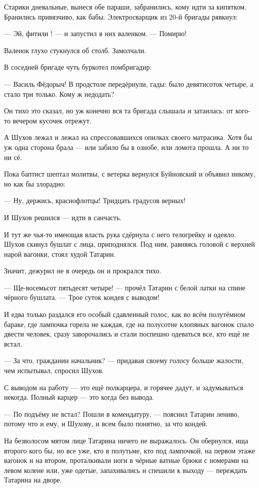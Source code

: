Старики дневальные, вынеся обе параши, забранились, кому идти за кипятком. Бранились 
привязчиво, как бабы. Электросварщик из 20-й бригады рявкнул:

--- Эй, фитили ! --- и запустил в них валенком. --- Помирю!

Валенок глухо стукнулся об столб. Замолчали.

В соседней бригаде чуть буркотел помбригадир:

--- Василь Фёдорыч! В продстоле передёрнули, гады: было девятисоток четыре, а стало три только. 
Кому ж недодать?

Он тихо это сказал, но уж конечно вся та бригада слышала и затаилась: от кого-то вечером 
кусочек отрежут.

А Шухов лежал и лежал на спрессовавшихся опилках своего матрасика. Хотя бы уж одна сторона 
брала --- или забило бы в ознобе, или ломота прошла. А ни то ни сё.

Пока баптист шептал молитвы, с ветерка вернулся Буйновский и объявил никому, но как бы 
злорадно:

--- Ну, держись, краснофлотцы! Тридцать градусов верных!

И Шухов решился --- идти в санчасть.

И тут же чья-то имеющая власть рука сдёрнула с него телогрейку и одеяло. Шухов скинул бушлат 
с лица, приподнялся. Под ним, равняясь головой с верхней нарой вагонки, стоял худой Татарин.

Значит, дежурил не в очередь он и прокрался тихо.

--- Ще-восемьсот пятьдесят четыре! --- прочёл Татарин с белой латки на спине чёрного бушлата. --- 
Трое суток кондея с выводом!

И едва только раздался его особый сдавленный голос, как во всём полутёмном бараке, где 
лампочка горела не каждая, где на полусотне клопяных вагонок спало двести человек, сразу 
заворочались и стали поспешно одеваться все, кто ещё не встал.

--- За что, гражданин начальник? --- придавая своему голосу больше жалости, чем испытывал, 
спросил Шухов.

С выводом на работу --- это ещё полкарцера, и горячее дадут, и задумываться некогда. Полный 
карцер --- это когда без вывода.

--- По подъёму не встал? Пошли в комендатуру, --- пояснил Татарин лениво, потому что и ему, и 
Шухову, и всем было понятно, за что кондей.

На безволосом мятом лице Татарина ничего не выражалось. Он обернулся, ища второго кого бы, но 
все уже, кто в полутьме, кто под лампочкой, на первом этаже вагонок и на втором, проталкивали 
ноги в чёрные ватные брюки с номерами на левом колене или, уже одетые, запахивались и спешили 
к выходу --- переждать Татарина на дворе.

